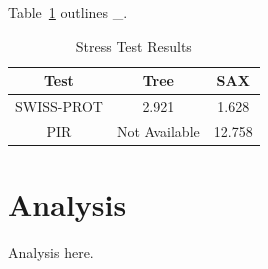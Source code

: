 \documentclass{acm_proc_article-sp}
\begin{document}
Table~\ref{stressTable} outlines \_.

\begin{table}[tbp]
\centering
\caption{Stress Test Results}
\label{stressTable}
\begin{tabular}{ c || c | c }

	Test & Tree & SAX\\ \hline
	SWISS-PROT & 2.921 & 1.628\\
	PIR & Not Available & 12.758\\

\end{tabular}
\end{table}

\section{Analysis}
Analysis here.


%

\end{document}
